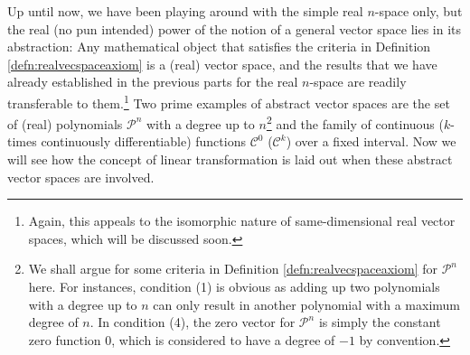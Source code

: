Up until now, we have been playing around with the simple real $n$-space only, but the real (no pun intended) power of the notion of a general vector space lies in its abstraction: Any mathematical object that satisfies the criteria in Definition \ref{defn:realvecspaceaxiom} is a (real) vector space, and the results that we have already established in the previous parts for the real $n$-space are readily transferable to them.\footnote{Again, this appeals to the isomorphic nature of same-dimensional real vector spaces, which will be discussed soon.} Two prime examples of abstract vector spaces are the set of (real) polynomials $\mathcal{P}^n$ with a degree up to $n$\footnote{We shall argue for some criteria in Definition \ref{defn:realvecspaceaxiom} for $\mathcal{P}^n$ here. For instances, condition (1) is obvious as adding up two polynomials with a degree up to $n$ can only result in another polynomial with a maximum degree of $n$. In condition (4), the zero vector for $\mathcal{P}^n$ is simply the constant zero function $0$, which is considered to have a degree of $-1$ by convention.} and the family of continuous ($k$-times continuously differentiable) functions $\mathcal{C}^0$ ($\mathcal{C}^k$) over a fixed interval. Now we will see how the concept of linear transformation is laid out when these abstract vector spaces are involved.

